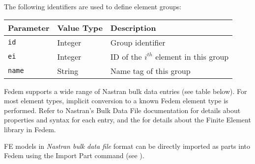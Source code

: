 
The following identifiers are used to define element groups:


\noindent
\begin{tabular}{| m{} | m{} | m{} |}
  \hline
  \rowcolor[HTML]{EFEFEF}
  Parameter & Value Type & Description \\
  \hline\hline
  {\tt id} & Integer & Group identifier \\
  \hline
  {\tt ei} & Integer & ID of the $i^{th}$ element in this group \\
  \hline
  {\tt name} & String & Name tag of this group \\
  \hline
\end{tabular}

\clearpage



Fedem supports a wide range of Nastran bulk data entries (see table below).
For most element types, implicit conversion to a known Fedem element type is
performed. Refer to Nastran's Bulk Data File documentation for details about
properties and syntax for each entry, and the
for details about the Finite Element library in Fedem.

FE models in {\sl Nastran bulk data file} format can be
directly imported as parts into Fedem using the Import Part command
(see ).


